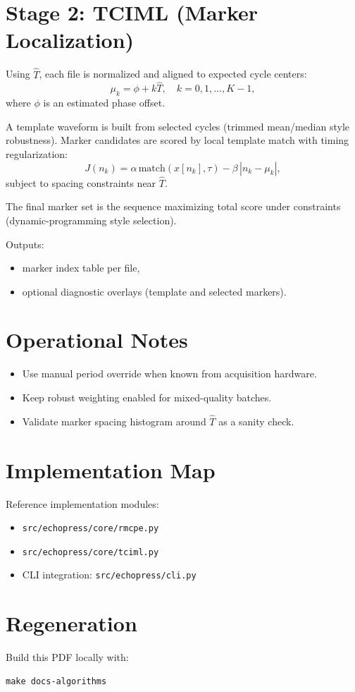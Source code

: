 \documentclass[11pt]{article}
\begin{document}
\section{Stage 2: TCIML (Marker Localization)}
Using $\hat{T}$, each file is normalized and aligned to expected cycle centers:
\begin{equation}
\mu_k = \phi + k\hat{T}, \quad k=0,1,\dots,K-1,
\end{equation}
where $\phi$ is an estimated phase offset.

A template waveform is built from selected cycles (trimmed mean/median style robustness). Marker candidates are scored by local template match with timing regularization:
\begin{equation}
J(n_k) = \alpha\,\mathrm{match}(x[n_k],\tau) - \beta\,\left|n_k-\mu_k\right|,
\end{equation}
subject to spacing constraints near $\hat{T}$.

The final marker set is the sequence maximizing total score under constraints (dynamic-programming style selection).

Outputs:
\begin{itemize}
  \item marker index table per file,
  \item optional diagnostic overlays (template and selected markers).
\end{itemize}

\section{Operational Notes}
\begin{itemize}
  \item Use manual period override when known from acquisition hardware.
  \item Keep robust weighting enabled for mixed-quality batches.
  \item Validate marker spacing histogram around $\hat{T}$ as a sanity check.
\end{itemize}

\section{Implementation Map}
Reference implementation modules:
\begin{itemize}
  \item \texttt{src/echopress/core/rmcpe.py}
  \item \texttt{src/echopress/core/tciml.py}
  \item CLI integration: \texttt{src/echopress/cli.py}
\end{itemize}

\section{Regeneration}
Build this PDF locally with:
\begin{verbatim}
make docs-algorithms
\end{verbatim}
\end{document}
